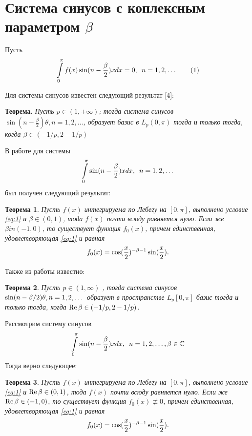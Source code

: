 ﻿\documentclass[oneside, final, 14pt]{extreport}
\newtheorem{theorem}{Теорема}
\begin{document}
\section{Система синусов с коплексным параметром $\beta$}

Пусть \begin{equation}\int\limits_0^{\pi}f(x)\sin(n - \frac{\beta}{2})xdx = 0, \enspace n = 1, 2, \dots \tag{1} \label{eq:1}\end{equation}
	
	Для системы синусов известен следующий результат [4]:
	
	\medskip
	\textbf{Теорема.} \itshape Пусть $p \in (1, +\infty)$; тогда система синусов 
	$\sin(n - \frac{\beta}{2})\theta, n = 1, 2, \ldots$, 
	образует базис в $L_p(0, \pi)$ тогда и только тогда, 
	когда $\beta \in (-1/p, 2 - 1/p)$
	\normalfont

	В работе \cite{moi:gul} для системы 
	$$\int\limits_0^{\pi}\sin(n - \frac{\beta}{2})xdx, \enspace n = 1, 2, \dots$$ 
	был получен следующий результат:
	
	\begin{theorem}
		Пусть $f(x)$ интегрируема по Лебегу на $[0, \pi]$, выполнено условие
		\eqref{eq:1} и $\beta \in (0, 1)$, тода $f(x)$ почти всюду равняется нулю. 
		Если же  $\beta in (-1, 0)$, то существует функция $f_0(x)$, причем
		единственная, удовлетворяющая \eqref{eq:1} и равная $$f_0(x) = \cos(\frac{x}{2})^{-\beta-1}\sin(\frac{x}{2}).$$
	\end{theorem}
	
	Также из работы  \cite{dev:dis} известно:
	\begin{theorem}
		Пусть $p \in (1, \infty)$ , тогда система синусов $\sin(n - \beta / 2)\theta, \\
		n = 1, 2, \dots$ образует в пространстве $L_p[0, \pi]$ базис тогда и только тогда, 
		когда $\operatorname{Re}\beta \in (-1/p, 2 - 1/p)$.
	\end{theorem}
	
	
	Рассмотрим систему синусов $$\int\limits_0^{\pi}\sin(n - \frac{\beta}{2})xdx, \enspace n = 1, 2, \dots, \beta\in\mathbb{C}$$
	Тогда верно следующее:
	\begin{theorem}
		Пусть $f(x)$ интегрируема по Лебегу на $[0, \pi]$, выполнено условие
		\eqref{eq:1} и \thinspace $\operatorname{Re}\beta \in (0, 1)$, 
		тода $f(x)$ почти всюду равняется нулю. Если же \thinspace  
		$\operatorname{Re}\beta \in (-1, 0)$, то существует функция $f_0(x) \not\equiv 0$, 
		причем единственная, удовлетворяющая \eqref{eq:1} и равная $$f_0(x) = \cos(\frac{x}{2})^{-\beta-1}\sin(\frac{x}{2}).$$
	\end{theorem}
	
\end{document}
